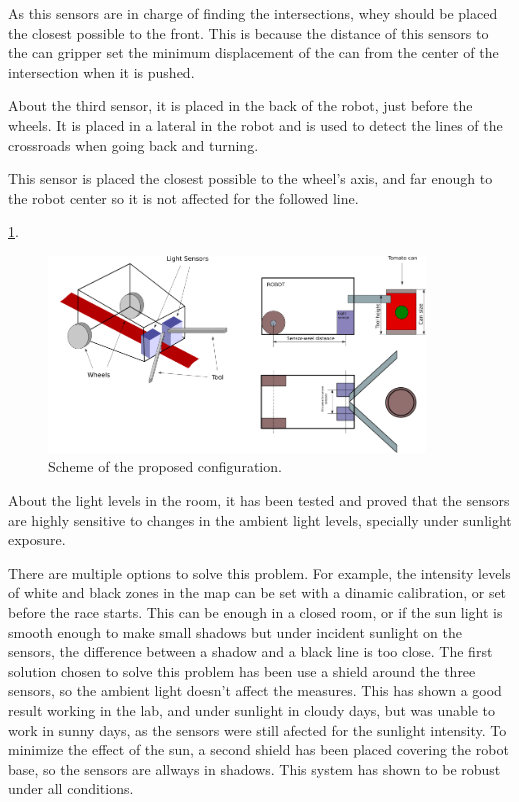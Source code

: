 As this sensors are in charge of finding the intersections, whey should be placed the closest possible to the front.
This is because the distance of this sensors to the can gripper set the minimum displacement of the can from the center
of the intersection when it is pushed.

About the third sensor, it is placed in the back of the robot, just before the wheels.
It is placed in a lateral in the robot and is used to detect the lines of the crossroads when going back and turning.

This sensor is placed the closest possible to the wheel's axis, and far enough to the robot center so it is not affected
for the followed line.

\ref{fig:robotscheme}.



\begin{figure}[H]
\includegraphics[width=10cm]{Fig2.png}
\centering
\caption{Scheme of the proposed configuration.}
\label{fig:robotscheme}
\end{figure}


About the light levels in the room, it has been tested and proved that the sensors are highly sensitive to changes in 
the ambient light levels, specially under sunlight exposure. 

There are multiple options to solve this problem.
For example, the intensity levels of white and black zones in the map can be set with a dinamic calibration, or set 
before the race starts. 
This can be enough in a closed room, or if the sun light is smooth enough to make small shadows but under incident sunlight
on the sensors, the difference between a shadow and a black line is too close.
The first solution chosen to solve this problem has been use a shield around the three sensors, so the ambient light 
doesn't affect the measures.
This has shown a good result working in the lab, and under sunlight in cloudy days, but was unable to work in sunny days,
as the sensors were still afected for the sunlight intensity.
To minimize the effect of the sun, a second shield has been placed covering the robot base, so the sensors are allways in
shadows.
This system has shown to be robust under all conditions.

